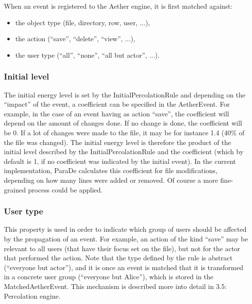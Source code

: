 \documentclass{ecscw2007}
\begin{document}
When an event is registered to the Aether engine, it is first matched against:
\begin{itemize}
   \item the object type (file, directory, row, user, ...),
   \item the action (``save'', ``delete'', ``view'', ...),
   \item the user type (``all'', ``none'', ``all but actor'', ...).
\end{itemize}

\subsubsection*{Initial level}
The initial energy level is set by the InitialPercolationRule and depending on the ``impact'' of the event, a coefficient can be specified in the AetherEvent. For example, in the case of an event having as action ``save'', the coefficient will depend on the amount of changes done. If no change is done, the coefficient will be 0. If a lot of changes were made to the file, it may be for instance 1.4 (40\% of the file was changed).
The initial energy level is therefore the product of the initial level described by the InitialPercolationRule and the coefficient (which by default is 1, if no coefficient was indicated by the initial event).
In the current implementation, ParaDe calculates this coefficient for file modifications, depending on how many lines were added or removed. Of course a more fine-grained process could be applied.

\subsubsection*{User type}
This property is used in order to indicate which group of users should be affected by the propagation of an event. For example, an action of the kind ``save'' may be relevant to all users (that have their focus set on the file), but not for the actor that performed the action. Note that the type defined by the rule is abstract (``everyone but actor''), and it is once an event is matched that it is transformed in a concrete user group (``everyone but Alice''), which is stored in the MatchedAetherEvent. This mechanism is described more into detail in 3.5: Percolation engine.
\end{document}
